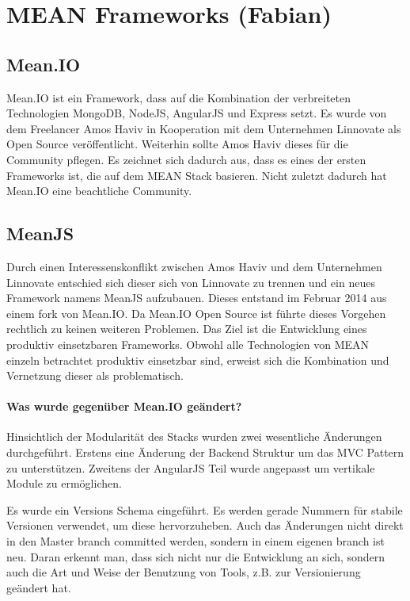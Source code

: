 \chapter{MEAN Frameworks (Fabian)}\label{mean-frameworks-fabian}

\section{Mean.IO}\label{mean.io}

Mean.IO ist ein Framework, dass auf die Kombination der verbreiteten
Technologien MongoDB, NodeJS, AngularJS und Express setzt. Es wurde
von dem Freelancer Amos Haviv in Kooperation mit dem Unternehmen
Linnovate als Open Source veröffentlicht. Weiterhin sollte Amos Haviv
dieses für die Community pflegen. Es zeichnet sich dadurch aus, dass es
eines der ersten Frameworks ist, die auf dem MEAN Stack basieren. Nicht
zuletzt dadurch hat Mean.IO eine beachtliche Community.

\section{MeanJS}\label{mean.js}

Durch einen Interessenskonflikt zwischen Amos Haviv und dem Unternehmen
Linnovate entschied sich dieser sich von Linnovate zu trennen und ein neues Framework namens MeanJS
aufzubauen. Dieses entstand im Februar
2014 aus einem fork von Mean.IO. Da Mean.IO Open Source ist führte dieses
Vorgehen rechtlich zu keinen weiteren Problemen. Das Ziel ist die Entwicklung eines produktiv
einsetzbaren Frameworks. Obwohl alle Technologien von MEAN einzeln
betrachtet produktiv einsetzbar sind, erweist sich die Kombination und Vernetzung
dieser als problematisch.

\subsubsection{Was wurde gegenüber Mean.IO geändert?}

Hinsichtlich der Modularität des Stacks wurden zwei wesentliche Änderungen durchgeführt. Erstens eine Änderung der Backend Struktur um das MVC Pattern zu unterstützen. Zweitens der AngularJS Teil wurde angepasst um vertikale Module zu ermöglichen.

Es wurde ein Versions Schema eingeführt. Es werden gerade Nummern für stabile Versionen verwendet, um diese hervorzuheben. Auch das Änderungen nicht direkt in den Master branch committed werden, sondern in einem eigenen branch ist neu. Daran erkennt man, dass sich nicht nur die Entwicklung an sich, sondern auch die Art und Weise der Benutzung von Tools, z.B. zur Versionierung geändert hat.

